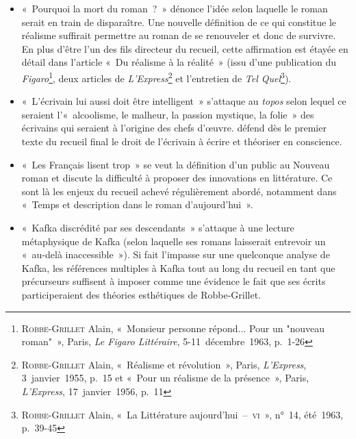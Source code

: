 \documentclass[12pt, a4paper]{article}
\begin{document}
\begin{itemize}
    \item «~Pourquoi la mort du roman~?~» dénonce l'idée selon laquelle le roman serait en train de disparaître. Une nouvelle définition de ce qui constitue le réalisme suffirait permettre au roman de se renouveler et donc de survivre. En plus d'être l'un des fils directeur du recueil, cette affirmation est étayée en détail dans l'article «~Du réalisme à la réalité~» (issu d'une publication du \textit{Figaro}\footnote{\textsc{Robbe-Grillet} Alain, «~Monsieur personne répond... Pour un "nouveau roman"~», Paris, \textit{Le Figaro Littéraire}, 5-11~décembre~1963, p.~1-26}, deux articles de \textit{L'Express}\footnote{\textsc{Robbe-Grillet} Alain, «~Réalisme et révolution~», Paris, \textit{L'Express}, 3~janvier~1955, p.~15 et «~Pour un réalisme de la présence~», Paris, \textit{L'Express}, 17~janvier~1956, p.~11} et l'entretien de \textit{Tel Quel}\footnote{\textsc{Robbe-Grillet} Alain, «~La Littérature aujourd'hui~–~\textsc{vi}~», n°~14, été~1963, p.~39-45}).
    \item «~L’écrivain lui aussi doit être intelligent~» s'attaque au \textit{topos} selon lequel ce seraient l'«~alcoolisme, le malheur, la passion mystique, la folie~» des écrivains qui seraient à l'origine des chefs d'œuvre. \robbe{} défend dès le premier texte du recueil final le droit de l'écrivain à écrire et théoriser en conscience.
    \item «~Les Français lisent trop~» se veut la définition d'un public au Nouveau roman et discute la difficulté à proposer des innovations en littérature. Ce sont là les enjeux du recueil achevé régulièrement abordé, notamment dans «~Temps et description dans le roman d'aujourd'hui~».
    \item «~Kafka discrédité par ses descendants~» s'attaque à une lecture métaphysique de Kafka (selon laquelle ses romans laisserait entrevoir un «~au-delà inaccessible~»). Si \punr{} fait l'impasse sur une quelconque analyse de Kafka, les références multiples à Kafka tout au long du recueil en tant que précurseurs suffisent à imposer comme une évidence le fait que ses écrits participeraient des théories esthétiques de Robbe-Grillet.
\end{itemize}
\end{document}
